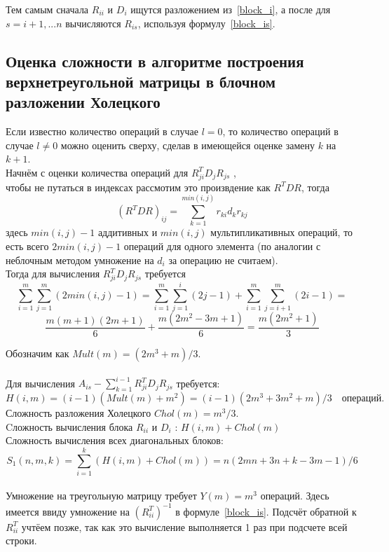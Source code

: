 \documentclass[a4paper,12pt]{article}
\begin{document}
    Тем самым сначала $R_{ii}$ и $D_i$ ищутся разложением из~\eqref{block_i}, 
    а после для $s = i+1,...n$ вычисляются $R_{is}$, используя формулу~\eqref{block_is}.


\newpage
\subsection{Оценка сложности в алгоритме построения верхнетреугольной матрицы
в блочном разложении Холецкого}   
    Если известно количество операций в случае $l = 0$, то количество 
    операций в случае $l \neq 0$ можно оценить сверху, сделав в имеющейся оценке замену $k$ на $k + 1$.  \\
    
    Начнём с оценки количества операций для $R_{ji}^T D_j R_{js}$ ,\\
    чтобы не путаться в индексах рассмотим это произвдение как $R^TDR$, тогда
    $$ (R^TDR)_{ij} = \sum_{k=1}^{min(i,j)} r_{ki} d_k r_{kj} $$
    здесь $min(i,j) - 1$ аддитивных и $min(i,j)$ мультипликативных операций, 
    то есть всего $2min(i,j) - 1$ операций для одного элемента 
    (по аналогии с неблочным методом умножение на $d_i$ за операцию не считаем). \\
    
    Тогда для вычисления $R_{ji}^T D_j R_{js}$ требуется 
    $$
        \sum_{i=1}^m \sum_{j=1}^m (2min(i,j) - 1) =
        \sum_{i=1}^m \sum_{j=1}^i (2j - 1) + 
        \sum_{i=1}^m \sum_{j=i+1}^m (2i - 1) = $$$$
        \frac{m(m+1)(2m+1)}6 + \frac{m(2m^2-3m+1)}6 = 
        \frac{m(2m^2+1)}3 
    $$
    
    Обозначим как $ Mult(m) = (2m^3+m)/3 $. \\ \\
    
    Для вычисления $A_{is} - \sum_{k=1}^{i-1}R_{ji}^T D_j R_{js}$ требуется: 
    $$
        H(i,m) = 
        (i-1)(Mult(m)+m^2) = 
        (i-1)(2m^3+3m^2+m)/3 
        \quad \text{операций.}
    $$  
    Сложность разложения Холецкого $Chol(m) = m^3/3$. \\
    Cложность вычисления блока $R_{ii}$ и $D_i$ : $H(i,m) + Chol(m)$ \\
    Сложность вычисления всех диагональных блоков:
    $$ 
        S_1(n,m,k) = 
        \sum_{i=1}^k (H(i,m) + Chol(m)) =
        n(2mn + 3n + k - 3m -1)/6
    $$
    \\
    
    Умножение на треугольную матрицу требует $Y(m)=m^3$ операций.
    Здесь имеется ввиду умножение на $(R_{ii}^T)^{-1}$ в формуле~\eqref{block_is}. 
    Подсчёт обратной к $R_{ii}^T$ учтёем позже, так как это вычисление выполняется 1 раз при подсчете всей строки. \\
    
\end{document}
